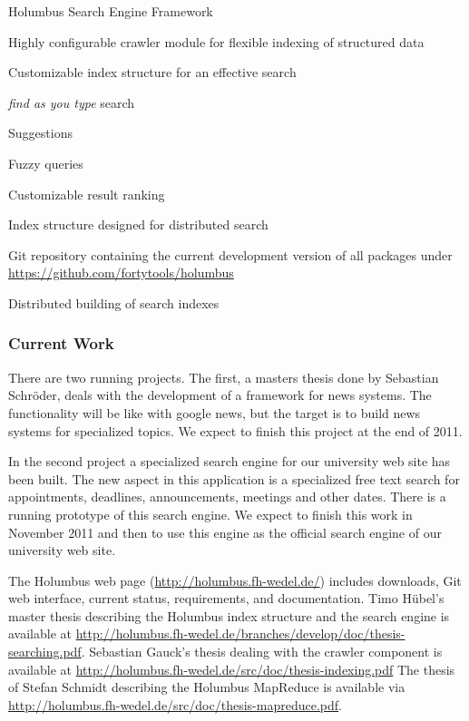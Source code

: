 \begin{hcarentry}[updated]{Holumbus Search Engine Framework}
\begin{compactitem}
\item Highly configurable crawler module for flexible indexing of structured data
\item Customizable index structure for an effective search
\item {\em find as you type} search
\item Suggestions
\item Fuzzy queries
\item Customizable result ranking
\item Index structure designed for distributed search
\item Git repository containing the current development version of all packages under
  \url{https://github.com/fortytools/holumbus}
\item Distributed building of search indexes
\end{compactitem}

\subsubsection*{Current Work}

There are two running projects. The first, a masters thesis done by Sebastian Schr\"oder,
deals with the development of a framework for news systems. The functionality
will be like with google news, but the target is to build news systems for specialized topics.
We expect to finish this project at the end of 2011.

In the second project a specialized search engine for our university web site has been built.
The new aspect in this application is a specialized free text search for appointments, deadlines,
announcements, meetings and other dates. There is a running prototype of this search engine.
We expect to finish this work in November 2011 and then to use this engine as the official
search engine of our university web site.

\FurtherReading

The Holumbus web page
(\url{http://holumbus.fh-wedel.de/})
includes downloads, Git web interface, current status, requirements, 
and documentation.
Timo H\"ubel's master thesis describing the Holumbus index structure and
the search engine is available at
\url{http://holumbus.fh-wedel.de/branches/develop/doc/thesis-searching.pdf}.
Sebastian Gauck's  thesis dealing with the crawler component is
available at
\url{http://holumbus.fh-wedel.de/src/doc/thesis-indexing.pdf}
The thesis of Stefan Schmidt describing the Holumbus MapReduce is
available via \url{http://holumbus.fh-wedel.de/src/doc/thesis-mapreduce.pdf}.
\end{hcarentry}

